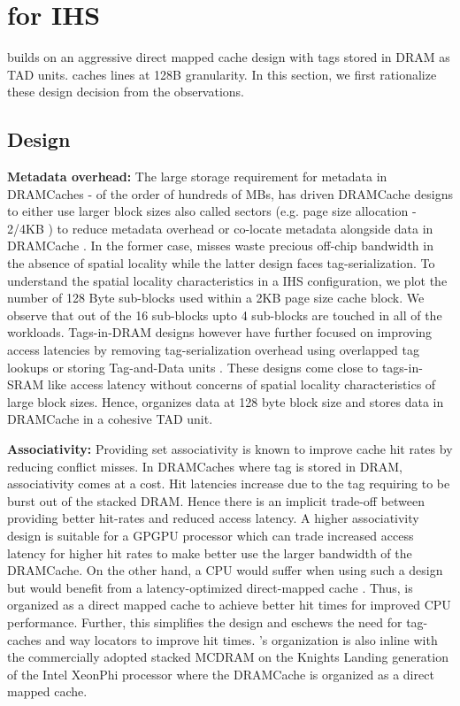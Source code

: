 \section{\cachename for IHS} \label{design}

\cachename builds on an aggressive direct mapped cache design with tags stored in DRAM as TAD units. \cachename caches lines at 128B granularity. In this section, we first rationalize these design decision from the observations.

\subsection{\cachename Design} \label{design}

\par \textbf{Metadata overhead:} The large storage requirement for metadata in DRAMCaches - of the order of hundreds of MBs, has driven DRAMCache designs to either use larger block sizes also called sectors (e.g. page size allocation - 2/4KB \cite{footprint,unison-cache}) to reduce metadata overhead or co-locate metadata alongside data in DRAMCache \cite{loh-hill,alloy,atcache}. In the former case, misses waste precious off-chip bandwidth in the absence of spatial locality while the latter design faces tag-serialization. To understand the spatial locality characteristics in a IHS configuration, we plot the number of 128 Byte sub-blocks used within a 2KB page size cache block. We observe that out of the 16 sub-blocks upto 4 sub-blocks are touched in all of the workloads. 
Tags-in-DRAM designs however have further focused on improving access latencies by removing tag-serialization overhead using overlapped tag lookups \cite{loh-hill} or storing Tag-and-Data units \cite{alloy}. These designs come close to tags-in-SRAM like access latency without concerns of spatial locality characteristics of large block sizes. Hence, \cachename organizes data at 128 byte block size and stores data in DRAMCache in a cohesive TAD unit.

\par \textbf{Associativity:} Providing set associativity is known to improve cache hit rates by reducing conflict misses. In DRAMCaches where tag is stored in DRAM,  associativity comes at a cost. Hit latencies increase due to the tag requiring to be burst out of the stacked DRAM. Hence there is an implicit trade-off between providing better hit-rates and reduced access latency. A higher associativity design is suitable for a GPGPU processor which can trade increased access latency for higher hit rates to make better use the larger bandwidth of the DRAMCache. On the other hand, a CPU would suffer when using such a design but would benefit from a latency-optimized direct-mapped cache \cite{alloy}. Thus, \cachename is organized as a direct mapped cache to achieve better hit times for improved CPU performance. Further, this simplifies the design and eschews the need for tag-caches \cite{atcache} and way locators \cite{bimodal} to improve hit times. \cachename's organization is also inline with the commercially adopted stacked MCDRAM on the Knights Landing generation of the Intel XeonPhi processor \cite{xeonphi} where the DRAMCache is organized as a direct mapped cache.

